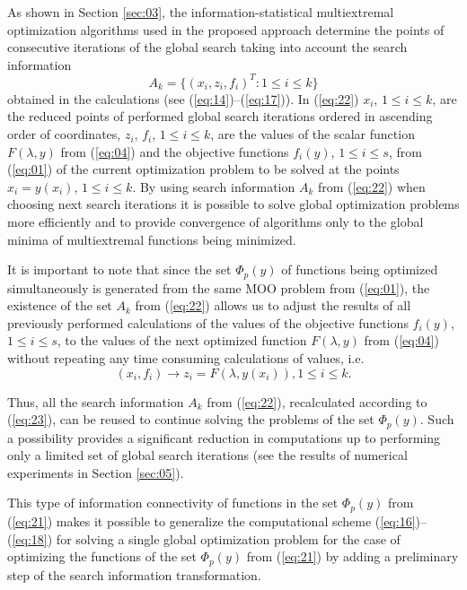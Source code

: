 \documentclass[runningheads]{llncs}
\begin{document}
As shown in Section \ref{sec:03}, the information-statistical multiextremal optimization algorithms used in the proposed approach determine the points of consecutive iterations of the global search taking into account the search information
\begin{equation}
\label{eq:22}
A_k=\{(x_i,z_i,f_i )^T:1 \leq i \leq k\}
\end{equation}
obtained in the calculations (see (\ref{eq:14})--(\ref{eq:17})). In (\ref{eq:22}) $x_i$, $1 \leq i \leq k$,  are the reduced points of performed global search iterations ordered in ascending order of coordinates,  $z_i$, $f_i$, $1 \leq i \leq k$, are the values of the scalar function $F(\lambda, y)$ from (\ref{eq:04}) and the objective functions $f_i(y)$, $1 \leq i \leq s$, from (\ref{eq:01}) of the current optimization problem to be solved at the points $x_i=y(x_i)$, $1 \leq i \leq k$. By using search information $A_k$ from (\ref{eq:22}) when choosing next search iterations it is possible to solve global optimization problems more efficiently and to provide convergence of algorithms only to the global minima of multiextremal functions being minimized.

It is important to note that since the set $\Phi_p(y)$ of functions being optimized  simultaneously is generated from the same MOO problem from (\ref{eq:01}), the existence of the set $A_k$ from (\ref{eq:22}) allows us to adjust the results of all previously performed calculations of the values of the objective functions $f_i(y)$, $1 \leq i \leq s$, to the values of the next optimized function $F(\lambda, y)$ from (\ref{eq:04}) without repeating any time consuming calculations of values, i.e.
\begin{equation}
\label{eq:23}
(x_i,f_i ) \to z_i=F(\lambda, y(x_i)) ,1 \leq i \leq k.
\end{equation}

Thus, all the search information $A_k$ from (\ref{eq:22}), recalculated according to (\ref{eq:23}), can be reused to continue solving the problems of the set $\Phi_p(y)$. Such a possibility provides a significant reduction in computations up to performing only a limited set of global search iterations (see the results of numerical experiments in Section \ref{sec:05}).

     This type of information connectivity of functions in the set $\Phi_p(y)$ from (\ref{eq:21}) makes it possible to generalize the computational scheme (\ref{eq:16})--(\ref{eq:18}) for solving a single global optimization problem for the case of optimizing the functions of the set $\Phi_p(y)$ from (\ref{eq:21}) by adding a preliminary step of the search information  transformation.
\end{document}
